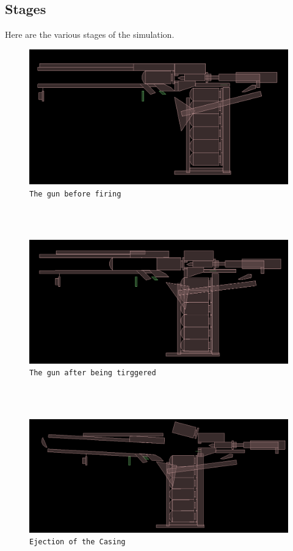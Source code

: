 \documentclass{article}
\begin{document}
\subsection{Stages}
Here are the various stages of the simulation.
\\
\begin{figure}[hbtp]
\centering
\includegraphics[scale=0.3]{before_firing.png}
\caption{\texttt{The gun before firing}}
\end{figure}
\\
\\
\begin{figure}[hbtp]
\centering
\includegraphics[scale=0.3]{shoot.png}
\caption{\texttt{The gun after being tirggered}}
\end{figure}
\\
\\
\begin{figure}[hbtp]
\centering
\includegraphics[scale=0.3]{ejection.png}
\caption{\texttt{Ejection of the Casing}}
\end{figure}
\end{document}
